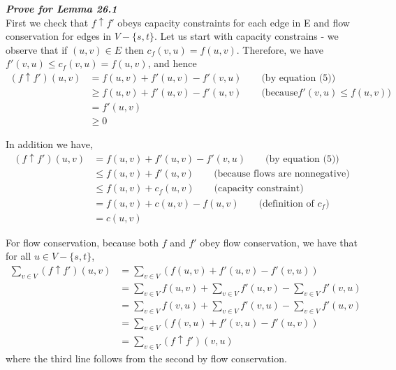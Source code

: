 \documentclass[12pt]{article}
\begin{document}
\textbf{\textit{Prove for Lemma 26.1}}\\
First we check that $f \uparrow f'$ obeys capacity constraints for each edge in E and flow conservation for edges in $V-\{s, t\}$. Let us start with capacity constrains - we observe that if $(u, v) \in E$ then $c_f(v, u) = f(u, v)$. Therefore, we have $f'(v, u) \leq c_f(v, u) = f(u, v)$, and hence 
\begin{align*}
(f \uparrow f')(u, v) &= f(u, v) + f'(u, v) - f'(v, u) \qquad \text{(by equation (5))}\\
&\geq f(u, v) + f'(u, v) - f'(u, v) \qquad \text{(because} f'(v, u) \leq f(u, v))\\
&= f'(u, v)\\
&\geq 0 
\end{align*}

In addition we have, 
\begin{align*}
(f \uparrow f')(u, v) &= f(u, v) + f'(u, v) - f'(v, u) \qquad \text{(by equation (5))}\\
&\leq f(u, v) + f'(u, v) \qquad \text{(because flows are nonnegative)}\\
&\leq f(u, v) + c_f(u, v) \qquad \text{(capacity constraint)}\\
&= f(u, v) + c(u, v) - f(u, v) \qquad \text{(definition of } c_f)\\
&= c(u, v) 
\end{align*}

For flow conservation, because both $f$ and $f'$ obey flow conservation, we have that for all $u \in V - \{s, t\}$,
\begin{align*}
\sum_{v \in V} (f \uparrow f')(u, v) &= \sum_{v \in V} (f(u, v) + f'(u, v) - f'(v, u))\\
&= \sum_{v \in V} f(u, v) + \sum_{v \in V} f'(u, v) - \sum_{v \in V} f'(v, u)\\
&= \sum_{v \in V} f(v, u) + \sum_{v \in V} f'(v, u) - \sum_{v \in V} f'(u, v)\\
&= \sum_{v \in V} (f(v, u) + f'(v, u) - f'(u, v))\\
&= \sum_{v \in V} (f \uparrow f')(v, u)
\end{align*}
where the third line follows from the second by flow conservation. \\
\end{document}
